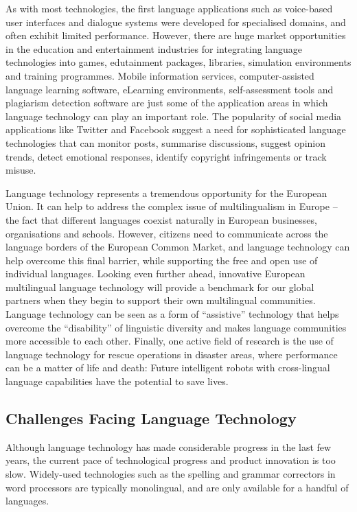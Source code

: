 \begin{multicols}{2}
As with most technologies, the first language applications such as voice-based user interfaces and dialogue systems were developed for specialised domains, and often exhibit limited performance. However, there are huge market opportunities in the education and entertainment industries for integrating language technologies into games, edutainment packages, libraries, simulation environments and training programmes. Mobile information services, computer-assisted language learning software, eLearning environments, self-assessment tools and plagiarism detection software are just some of the application areas in which language technology can play an important role. The popularity of social media applications like Twitter and Facebook suggest a need for sophisticated language technologies that can monitor posts, summarise discussions, suggest opinion trends, detect emotional responses, identify copyright infringements or track misuse.


Language technology represents a tremendous opportunity for the European Union. It can help to address the complex issue of multilingualism in Europe -- the fact that different languages coexist naturally in European businesses, organisations and schools. However, citizens need to communicate across the language borders of the European Common Market, and language technology can help overcome this final barrier, while supporting the free and open use of individual languages. Looking even further ahead, innovative European multilingual language technology will provide a benchmark for our global partners when they begin to support their own multilingual communities. Language technology can be seen as a form of “assistive” technology that helps overcome the “disability” of linguistic diversity and makes language communities more accessible to each other. Finally, one active field of research is the use of language technology for rescue operations in disaster areas, where performance can be a matter of life and death: Future intelligent robots with cross-lingual language capabilities have the potential to save lives.

\subsection{Challenges Facing Language Technology}

Although language technology has made considerable progress in the last few years, the current pace of technological progress and product innovation is too slow. Widely-used technologies such as the spelling and grammar correctors in word processors are typically monolingual, and are only available for a handful of languages. 


\end{multicols}
